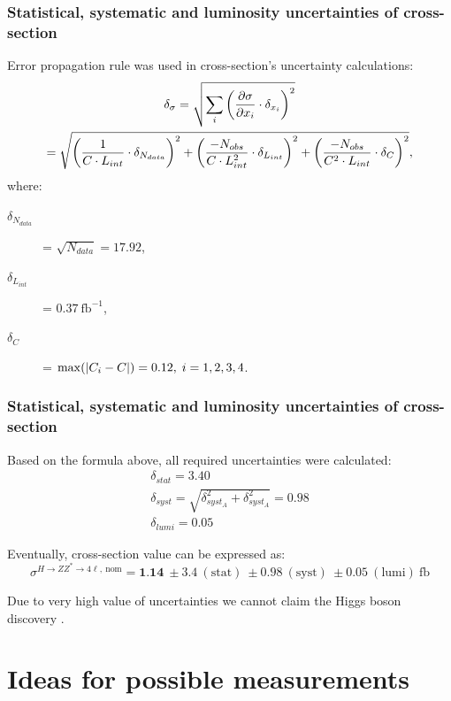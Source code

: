 \documentclass[aspectratio=1610, english]{beamer}
\newcommand{\hzz}{ H\rightarrow ZZ^{*}\rightarrow 4 \ell}
\begin{document}
\begin{frame}
\frametitle{Statistical, systematic and luminosity uncertainties of cross-section}
Error propagation rule was used in cross-section's uncertainty calculations:
\begin{equation}
\begin{gathered}
\delta_{\sigma}= \sqrt{\sum_i \qty ( \pdv{\sigma}{x_i}\cdot \delta_{x_i} )^2} \\
= \sqrt{\qty( \frac{1}{C\cdot L_{int}}\cdot \delta_{N_{data}})^2 + \qty( \frac{-N_{obs}}{C\cdot L_{int}^2}\cdot \delta_{L_{int}})^2 + \qty( \frac{-N_{obs}}{C^2\cdot L_{int}}\cdot \delta_{C})^2 } ,
\end{gathered}
\end{equation}
where:
\begin{description}
\item[$\delta_{N_{data}}$] = $\sqrt{N_{data}}=17.92$,
\item[$\delta_{L_{int}}$] = $0.37 \: \mathrm{fb}^{-1}$,
\item[$\delta_C$] = $\max(\abs{C_i-C})=0.12, \; i=1, 2, 3, 4$.
\end{description}
\vspace{1cm}

\end{frame}
\begin{frame}
\frametitle{Statistical, systematic and luminosity uncertainties of cross-section}
Based on the formula above, all required uncertainties were calculated:
\begin{eqnarray}
    \delta_{stat}=3.40 \nonumber \\
    \delta_{syst}=\sqrt{\delta_{syst_A}^2 +\delta_{syst_A}^2}=0.98 \nonumber \\
    \delta_{lumi}=0.05 \nonumber
\end{eqnarray}

Eventually, cross-section value can be expressed as: 
\begin{equation}
\sigma^{\hzz, \: \mathrm{nom}}=\textbf{1.14} \: \pm 3.4 \: \mathrm{(stat)} \: \pm 0.98 \: \mathrm{(syst)} \: \pm 0.05 \: \mathrm{(lumi) \: fb}
\end{equation}

Due to very high value of uncertainties we cannot claim the Higgs boson discovery \frownie .
\end{frame}

\section{Ideas for possible measurements}
\end{document}
